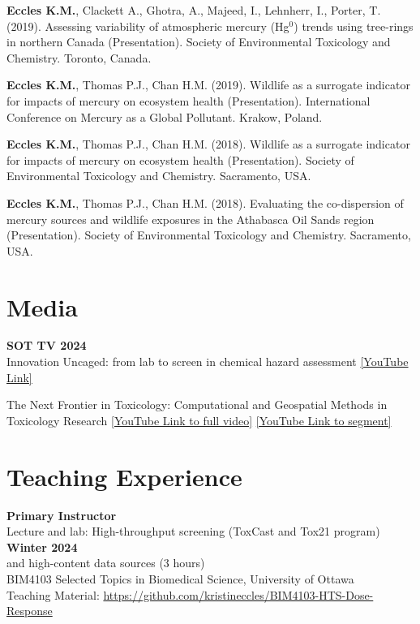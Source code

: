 \documentclass[margin,line]{res}
\begin{document}
\begin{resume}
\textbf{Eccles K.M.}, Clackett A., Ghotra, A., Majeed, I., Lehnherr, I., Porter, T. (2019). Assessing variability of atmospheric mercury (Hg$^{0}$) trends using tree-rings in northern Canada (Presentation). Society of Environmental Toxicology and Chemistry. Toronto, Canada.

\textbf{Eccles K.M.}, Thomas P.J., Chan H.M. (2019). Wildlife as a surrogate indicator for impacts of mercury on ecosystem health (Presentation). International Conference on Mercury as a Global Pollutant. Krakow, Poland.

\textbf{Eccles K.M.}, Thomas P.J., Chan H.M. (2018). Wildlife as a surrogate indicator for impacts of mercury on ecosystem health (Presentation). Society of Environmental Toxicology and Chemistry. Sacramento, USA.

\textbf{Eccles K.M.}, Thomas P.J., Chan H.M. (2018). Evaluating the co-dispersion of mercury sources and wildlife exposures in the Athabasca Oil Sands region (Presentation). Society of Environmental Toxicology and Chemistry. Sacramento, USA.


\pagebreak
\vspace*{.1in}
\section{\sc Media}
\textbf{SOT TV 2024}\\
Innovation Uncaged: from lab to screen in chemical hazard assessment \href{https://www.youtube.com/watch?v=6Pg7DvoHgP0}{[YouTube Link]}

The Next Frontier in Toxicology: Computational and Geospatial Methods in Toxicology Research \href{https://www.youtube.com/watch?v=-vlSMeWfeKs\&t=939s}{[YouTube Link to full video]}
\href{https://www.youtube.com/watch?v=vgu6d1uT8K4}{[YouTube Link to segment]}


\vspace*{.1in}
\section{\sc Teaching Experience}
\textbf{Primary Instructor}\\
Lecture and lab: High-throughput screening (ToxCast and Tox21 program) \hfill {\textbf{Winter 2024}}\\
and high-content data sources (3 hours)\\
BIM4103 Selected Topics in Biomedical Science, University of Ottawa\\
Teaching Material: \url{https://github.com/kristineccles/BIM4103-HTS-Dose-Response}


\end{resume}
\end{document}
